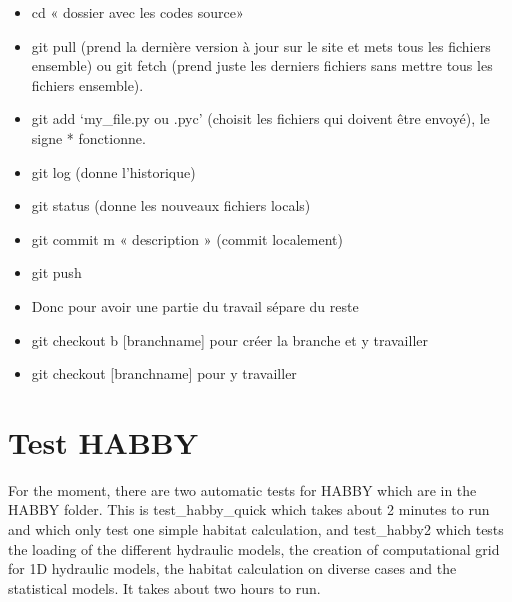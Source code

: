 \documentclass[letterpaper,10pt,english]{sphinxmanual}
\begin{document}
\begin{itemize}
\item {} 
cd « dossier avec les codes source»

\item {} 
git pull (prend la dernière version à jour sur le site et mets tous les fichiers ensemble) ou git fetch (prend juste les derniers fichiers sans mettre tous les fichiers ensemble).

\item {} 
git add ‘my\_file.py ou .pyc’ (choisit les fichiers qui doivent être envoyé), le signe * fonctionne.

\item {} 
git log (donne l’historique)

\item {} 
git status (donne les nouveaux fichiers locals)

\item {} 
git commit \textendash{}m « description » (commit localement)

\item {} 
git push

\end{itemize}

\begin{itemize}
\item {} 
Donc pour avoir une partie du travail sépare du reste

\item {} 
git checkout \textendash{}b {[}branchname{]} pour créer la branche et y travailler

\item {} 
git checkout {[}branchname{]} pour y travailler

\end{itemize}


\section{Test HABBY}
\label{\detokenize{index:test-habby}}
For the moment, there are two automatic tests for HABBY which are in the HABBY folder. This is test\_habby\_quick which takes about 2 minutes to run and which only test one simple habitat calculation, and test\_habby2 which tests the loading of the different hydraulic models, the creation of computational grid for 1D hydraulic models, the habitat calculation on diverse cases and the statistical models. It takes about two hours to run.
\end{document}
